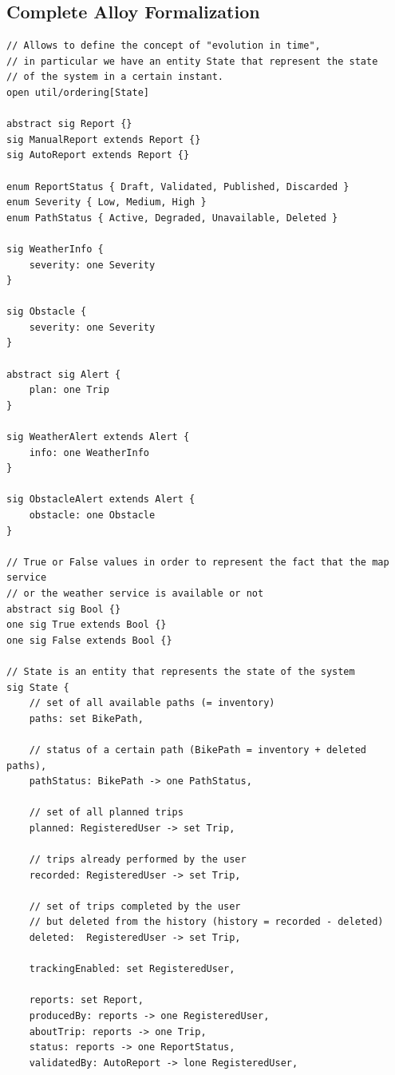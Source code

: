 \newpage
\subsection{Complete Alloy Formalization}

\begin{lstlisting}[caption=Complete Alloy Formalization.]
// Allows to define the concept of "evolution in time", 
// in particular we have an entity State that represent the state 
// of the system in a certain instant.
open util/ordering[State]

abstract sig Report {}
sig ManualReport extends Report {}
sig AutoReport extends Report {}

enum ReportStatus { Draft, Validated, Published, Discarded }
enum Severity { Low, Medium, High }
enum PathStatus { Active, Degraded, Unavailable, Deleted }

sig WeatherInfo {
    severity: one Severity
}

sig Obstacle {
    severity: one Severity
}

abstract sig Alert {
    plan: one Trip
}

sig WeatherAlert extends Alert {
    info: one WeatherInfo
}

sig ObstacleAlert extends Alert {
    obstacle: one Obstacle
}

// True or False values in order to represent the fact that the map service
// or the weather service is available or not
abstract sig Bool {}
one sig True extends Bool {}
one sig False extends Bool {}

// State is an entity that represents the state of the system
sig State {
    // set of all available paths (= inventory)
    paths: set BikePath,

    // status of a certain path (BikePath = inventory + deleted paths), 
    pathStatus: BikePath -> one PathStatus,

    // set of all planned trips
    planned: RegisteredUser -> set Trip,

    // trips already performed by the user
    recorded: RegisteredUser -> set Trip,	

    // set of trips completed by the user 
    // but deleted from the history (history = recorded - deleted)
    deleted:  RegisteredUser -> set Trip,

    trackingEnabled: set RegisteredUser,

    reports: set Report,
    producedBy: reports -> one RegisteredUser,
    aboutTrip: reports -> one Trip,
    status: reports -> one ReportStatus,
    validatedBy: AutoReport -> lone RegisteredUser,


\end{lstlisting}
